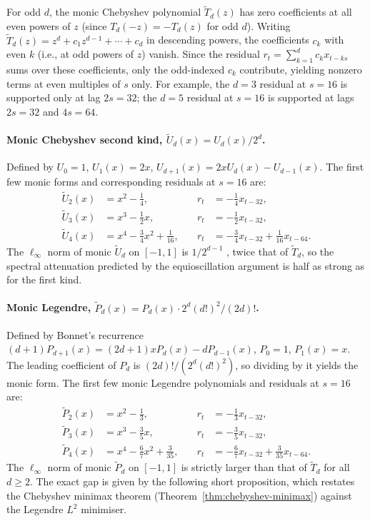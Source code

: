 \documentclass[11pt]{article}
\theoremstyle{plain}
\theoremstyle{definition}
\theoremstyle{remark}
\begin{document}
For odd $d$, the monic Chebyshev polynomial $\tilde T_d(z)$ has zero coefficients at all even powers of $z$ (since $T_d(-z) = -T_d(z)$ for odd $d$). Writing $\tilde T_d(z) = z^d + c_1 z^{d-1} + \cdots + c_d$ in descending powers, the coefficients $c_k$ with even $k$ (i.e., at odd powers of $z$) vanish. Since the residual $r_t = \sum_{k=1}^d c_k x_{t-ks}$ sums over these coefficients, only the odd-indexed $c_k$ contribute, yielding nonzero terms at even multiples of $s$ only. For example, the $d=3$ residual at $s = 16$ is supported only at lag $2s = 32$; the $d=5$ residual at $s = 16$ is supported at lags $2s = 32$ and $4s = 64$.

\paragraph{Monic Chebyshev second kind, $\tilde U_d(x) = U_d(x)/2^d$.}
Defined by $U_0 = 1$, $U_1(x) = 2x$, $U_{d+1}(x) = 2x U_d(x) - U_{d-1}(x)$. The first few monic forms and corresponding residuals at $s = 16$ are:
\[
\begin{aligned}
\tilde U_2(x) &= x^2 - \tfrac{1}{4}, &\quad r_t &= -\tfrac{1}{4} x_{t-32}, \\
\tilde U_3(x) &= x^3 - \tfrac{1}{2} x, &\quad r_t &= -\tfrac{1}{2} x_{t-32}, \\
\tilde U_4(x) &= x^4 - \tfrac{3}{4} x^2 + \tfrac{1}{16}, &\quad r_t &= -\tfrac{3}{4} x_{t-32} + \tfrac{1}{16} x_{t-64}.
\end{aligned}
\]
The $\ell_\infty$ norm of monic $\tilde U_d$ on $[-1,1]$ is $1/2^{d-1}$ \citep[Eq.~1.41]{mason2003chebyshev}, twice that of $\tilde T_d$, so the spectral attenuation predicted by the equioscillation argument is half as strong as for the first kind.

\paragraph{Monic Legendre, $\tilde P_d(x) = P_d(x) \cdot 2^d (d!)^2 / (2d)!$.}
Defined by Bonnet's recurrence $(d+1) P_{d+1}(x) = (2d+1) x P_d(x) - d P_{d-1}(x)$, $P_0 = 1$, $P_1(x) = x$. The leading coefficient of $P_d$ is $(2d)!/(2^d (d!)^2)$, so dividing by it yields the monic form. The first few monic Legendre polynomials and residuals at $s = 16$ are:
\[
\begin{aligned}
\tilde P_2(x) &= x^2 - \tfrac{1}{3}, &\quad r_t &= -\tfrac{1}{3} x_{t-32}, \\
\tilde P_3(x) &= x^3 - \tfrac{3}{5} x, &\quad r_t &= -\tfrac{3}{5} x_{t-32}, \\
\tilde P_4(x) &= x^4 - \tfrac{6}{7} x^2 + \tfrac{3}{35}, &\quad r_t &= -\tfrac{6}{7} x_{t-32} + \tfrac{3}{35} x_{t-64}.
\end{aligned}
\]
The $\ell_\infty$ norm of monic $\tilde P_d$ on $[-1,1]$ is strictly larger than that of $\tilde T_d$ for all $d \geq 2$. The exact gap is given by the following short proposition, which restates the Chebyshev minimax theorem (Theorem~\ref{thm:chebyshev-minimax}) against the Legendre $L^2$ minimiser.
\end{document}
